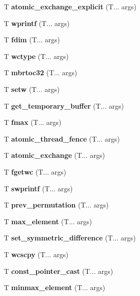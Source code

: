 \begin{DoxyCompactItemize}
\item 
\mbox{\label{atomic_exchange}} 
T \textbf{ atomic\+\_\+exchange\+\_\+explicit} (T... args)
\item 
\mbox{\label{fwprintf}} 
T \textbf{ wprintf} (T... args)
\item 
\mbox{\label{fdim}} 
T \textbf{ fdim} (T... args)
\item 
\mbox{\label{wctype}} 
T \textbf{ wctype} (T... args)
\item 
\mbox{\label{mbrtoc32}} 
T \textbf{ mbrtoc32} (T... args)
\item 
\mbox{\label{setw}} 
T \textbf{ setw} (T... args)
\item 
\mbox{\label{get_temporary_buffer}} 
T \textbf{ get\+\_\+temporary\+\_\+buffer} (T... args)
\item 
\mbox{\label{fmax}} 
T \textbf{ fmax} (T... args)
\item 
\mbox{\label{atomic_thread_fence}} 
T \textbf{ atomic\+\_\+thread\+\_\+fence} (T... args)
\item 
\mbox{\label{atomic_exchange}} 
T \textbf{ atomic\+\_\+exchange} (T... args)
\item 
\mbox{\label{fgetwc}} 
T \textbf{ fgetwc} (T... args)
\item 
\mbox{\label{fwprintf}} 
T \textbf{ swprintf} (T... args)
\item 
\mbox{\label{prev_permutation}} 
T \textbf{ prev\+\_\+permutation} (T... args)
\item 
\mbox{\label{max_element}} 
T \textbf{ max\+\_\+element} (T... args)
\item 
\mbox{\label{set_symmetric_difference}} 
T \textbf{ set\+\_\+symmetric\+\_\+difference} (T... args)
\item 
\mbox{\label{wcscpy}} 
T \textbf{ wcscpy} (T... args)
\item 
\mbox{\label{pointer_cast}} 
T \textbf{ const\+\_\+pointer\+\_\+cast} (T... args)
\item 
\mbox{\label{minmax_element}} 
T \textbf{ minmax\+\_\+element} (T... args)
\item 
\mbox{\label{wcstok}} 

\end{DoxyCompactItemize}

